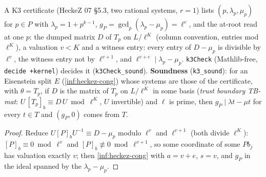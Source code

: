 \begin{definition}\label{chk:hz-k3}
  \leanok
  A K3 certificate (HeckeZ 07 \S5.3, two rational systems, $r=1$) lists $(p,\lambda_p,\mu_p)$ for $p\in P$ with $\lambda_p=1+p^{k-1}$,
  $g_P=\gcd_p(\lambda_p-\mu_p)=\ell^e$, and the at-root read at one $p$: the dumped matrix $D$ of $T_p$ on $L/\ell^K$ (column convention,
  entries mod $\ell^K$), a valuation $v<K$ and a witness entry: every entry of $D-\mu_p$ is divisible by $\ell^v$, the witness entry
  not by $\ell^{v+1}$, and $\ell^{v+e}\mid\lambda_p-\mu_p$. \texttt{k3Check} (Mathlib-free, \texttt{decide +kernel}) decides it
  (\texttt{k3Check\_sound}). \textbf{Soundness} (\texttt{k3\_sound}): for an Eisenstein split $E$ (\ref{inf:heckez-cong}) whose systems are those
  of the certificate, with $\theta=T_p$, if $D$ is the matrix of $T_p$ on $L/\ell^K$ in some basis (\emph{trust boundary TB-mat}:
  $U\,[T_p]_b\equiv D\,U\bmod\ell^K$, $U$ invertible) and $\ell$ is prime, then $g_P\mid\lambda t-\mu t$ for every $t\in T$ and $(g_P,0)$
  comes from $T$.
\end{definition}
\begin{proof}
  \leanok
  Reduce $U[P]_bU^{-1}\equiv D-\mu_p$ modulo $\ell^v$ and $\ell^{v+1}$ (both divide $\ell^K$): $[P]_b\equiv0\bmod\ell^v$ and
  $[P]_b\not\equiv0\bmod\ell^{v+1}$, so some coordinate of some $P b_j$ has valuation exactly $v$; then \ref{inf:heckez-cong} with
  $a=v+e$, $s=v$, and $g_P$ in the ideal spanned by the $\lambda_p-\mu_p$.
\end{proof}

